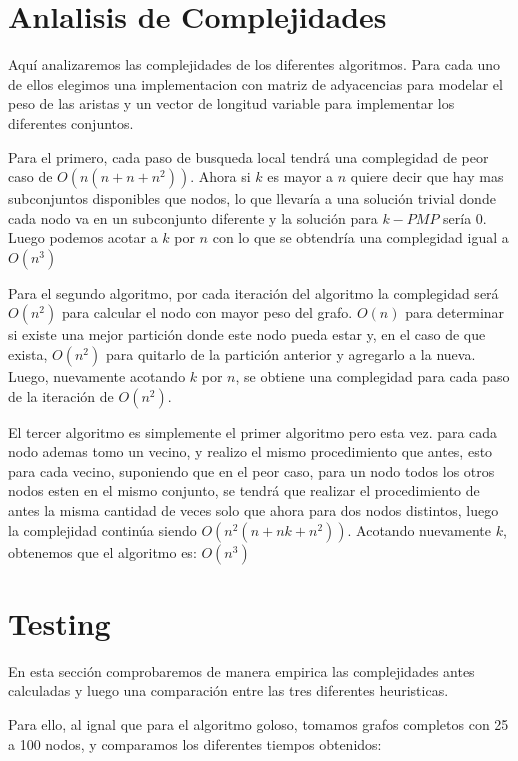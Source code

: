 \newpage

\section{Anlalisis de Complejidades}

Aquí analizaremos las complejidades de los diferentes algoritmos. Para cada uno de ellos elegimos una implementacion con matriz de adyacencias para modelar el peso de las aristas y un vector de longitud variable para implementar los diferentes conjuntos.

Para el primero, cada paso de busqueda local tendrá una complegidad de peor caso de $O(n(n + n + n^2))$. Ahora si $k$ es mayor a $n$ quiere decir que hay mas subconjuntos disponibles que nodos, lo que llevaría a una solución trivial donde cada nodo va en un subconjunto diferente y la solución para $k-PMP$ sería 0.
Luego podemos acotar a $k$ por $n$ con lo que se obtendría una complegidad igual a $O(n^3)$

Para el segundo algoritmo, por cada iteración del algoritmo la complegidad será $O(n^2)$ para calcular el nodo con mayor peso del grafo. $O(n)$ para determinar si existe una mejor partición donde este nodo pueda estar y, en el caso de que exista, $O(n^2)$ para quitarlo de la partición anterior y agregarlo a la nueva. Luego, nuevamente acotando $k$ por $n$, se obtiene una complegidad para cada paso de la iteración de $O(n^2)$.

El tercer algoritmo es simplemente el primer algoritmo pero esta vez. para cada nodo ademas tomo un vecino, y realizo el mismo procedimiento que antes, esto para cada vecino, suponiendo que en el peor caso, para un nodo todos los otros nodos esten en el mismo conjunto, se tendrá que realizar el procedimiento de antes la misma cantidad de veces solo que ahora para dos nodos distintos, luego la complejidad continúa siendo $O(n^2 (n + n k + n^2))$. Acotando nuevamente $k$, obtenemos que el algoritmo es: $O(n^3)$

\section{Testing}

En esta sección comprobaremos de manera empirica las complejidades antes calculadas y luego una comparación entre las tres diferentes heuristicas.

Para ello, al ignal que para el algoritmo goloso, tomamos grafos completos con 25 a 100 nodos, y comparamos los diferentes tiempos obtenidos:

